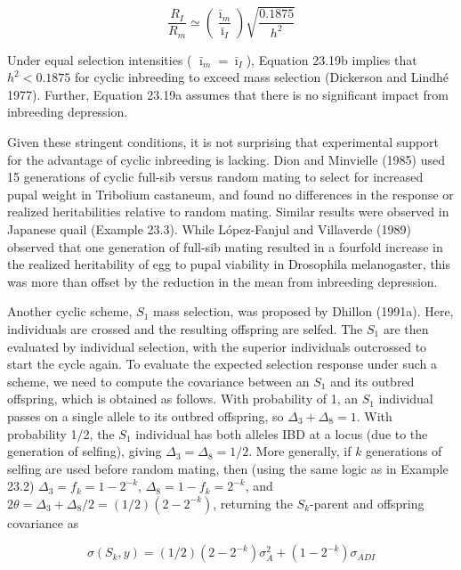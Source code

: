 \documentclass{article}
\begin{document}
\begin{equation}
\frac{R_{I}}{R_{m}}\simeq\left(\frac{\bar{\imath}_{m}}{\bar{\imath}_{I}}\right)\sqrt{\frac{0.1875}{h^{2}}}
\tag{23.19b}
\label{eq:23_19b}
\end{equation}

Under equal selection intensities ( $ \bar{\imath}_m = \bar{\imath}_I $), Equation 23.19b implies that  $ h^2 < 0.1875 $ for cyclic inbreeding to exceed mass selection (Dickerson and Lindhé 1977). Further, Equation 23.19a assumes that there is no significant impact from inbreeding depression.

Given these stringent conditions, it is not surprising that experimental support for the advantage of cyclic inbreeding is lacking. Dion and Minvielle (1985) used 15 generations of cyclic full-sib versus random mating to select for increased pupal weight in Tribolium castaneum, and found no differences in the response or realized heritabilities relative to random mating. Similar results were observed in Japanese quail (Example 23.3). While López-Fanjul and Villaverde (1989) observed that one generation of full-sib mating resulted in a fourfold increase in the realized heritability of egg to pupal viability in Drosophila melanogaster, this was more than offset by the reduction in the mean from inbreeding depression.

Another cyclic scheme,  $ S_1 $ mass selection, was proposed by Dhillon (1991a). Here, individuals are crossed and the resulting offspring are selfed. The  $ S_1 $ are then evaluated by individual selection, with the superior individuals outcrossed to start the cycle again. To evaluate the expected selection response under such a scheme, we need to compute the covariance between an  $ S_1 $ and its outbred offspring, which is obtained as follows. With probability of 1, an  $ S_1 $ individual passes on a single allele to its outbred offspring, so  $ \Delta_3 + \Delta_8 = 1 $. With probability 1/2, the  $ S_1 $ individual has both alleles IBD at a locus (due to the generation of selfing), giving  $ \Delta_3 = \Delta_8 = 1/2 $. More generally, if  $ k $ generations of selfing are used before random mating, then (using the same logic as in Example 23.2)  $ \Delta_3 = f_k = 1 - 2^{-k} $,  $ \Delta_8 = 1 - f_k = 2^{-k} $, and  $ 2\theta = \Delta_3 + \Delta_8/2 = (1/2)(2 - 2^{-k}) $, returning the  $ S_k $-parent and offspring covariance as

\begin{equation}
\sigma(S_{k},y)=(1/2)(2-2^{-k})\sigma_{A}^{2}+(1-2^{-k})\sigma_{ADI}
\tag{23.20a}
\label{eq:23_20a}
\end{equation}
\end{document}
